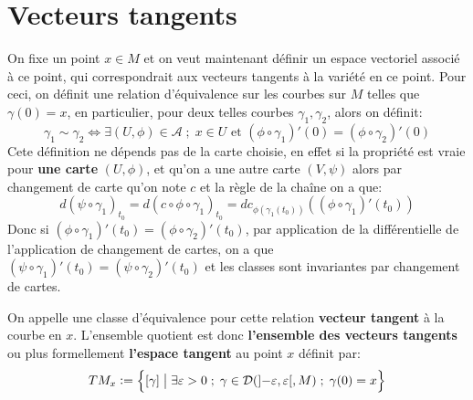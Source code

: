 \section{Vecteurs tangents}
On fixe un point \( x \in M \) et on veut maintenant définir un espace vectoriel associé à ce point, qui correspondrait aux vecteurs tangents à la variété en ce point. Pour ceci, on définit une relation d'équivalence sur les courbes sur \( M \) telles que \( \gamma(0) = x \), en particulier, pour deux telles courbes \( \gamma_1, \gamma_2 \), alors on définit:
\[ 
   \gamma_1 \sim \gamma_2 \iff \exists (U, \phi) \in \mathcal{A} \; ; \; x \in U \text{ et } (\phi \circ \gamma_1)'(0) = (\phi \circ \gamma_2)'(0)
\]
Cete définition ne dépends pas de la carte choisie, en effet si la propriété est vraie pour \textbf{une carte} \( (U, \phi) \), et qu'on a une autre carte \( (V, \psi) \) alors par changement de carte qu'on note \( c \) et la règle de la chaîne on a que:
\[ 
   d(\psi \circ \gamma_1)_{t_0} = d(c \circ \phi \circ \gamma_1)_{t_0} =  dc_{\phi(\gamma_1(t_0))}\left((\phi \circ \gamma_1)'(t_0)\right)
\]
Donc si \((\phi \circ \gamma_1)'(t_0) = (\phi \circ \gamma_2)'(t_0)\), par application de la différentielle de l'application de changement de cartes, on a que \( (\psi \circ \gamma_1)'(t_0) = (\psi \circ \gamma_2)'(t_0) \) et les classes sont invariantes par changement de cartes.\<

On appelle une classe d'équivalence pour cette relation \textbf{vecteur tangent} à la courbe en \( x \). L'ensemble quotient est donc \textbf{l'ensemble des vecteurs tangents} ou plus formellement \textbf{l'espace tangent} au point \( x \) définit par:
\[ 
   TM_x := \left\{ [\gamma] \; \bigr| \; \exists \epsilon > 0 \; ; \; \gamma \in \mathcal{D}( \ioo{- \epsilon}{\epsilon}, M) \; ; \; \gamma(0) = x \right\}  
\]
\pagebreak

